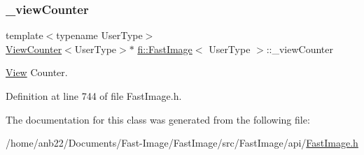 \subsubsection{\texorpdfstring{\+\_\+view\+Counter}{\_viewCounter}}
{\footnotesize\ttfamily template$<$typename User\+Type$>$ \\
\hyperlink{classfi_1_1ViewCounter}{View\+Counter}$<$User\+Type$>$$\ast$ \hyperlink{classfi_1_1FastImage}{fi\+::\+Fast\+Image}$<$ User\+Type $>$\+::\+\_\+view\+Counter\hspace{0.3cm}{\ttfamily [private]}}



\hyperlink{classfi_1_1View}{View} Counter. 



Definition at line 744 of file Fast\+Image.\+h.



The documentation for this class was generated from the following file\+:\begin{DoxyCompactItemize}
\item 
/home/anb22/\+Documents/\+Fast-\/\+Image/\+Fast\+Image/src/\+Fast\+Image/api/\hyperlink{FastImage_8h}{Fast\+Image.\+h}\end{DoxyCompactItemize}
